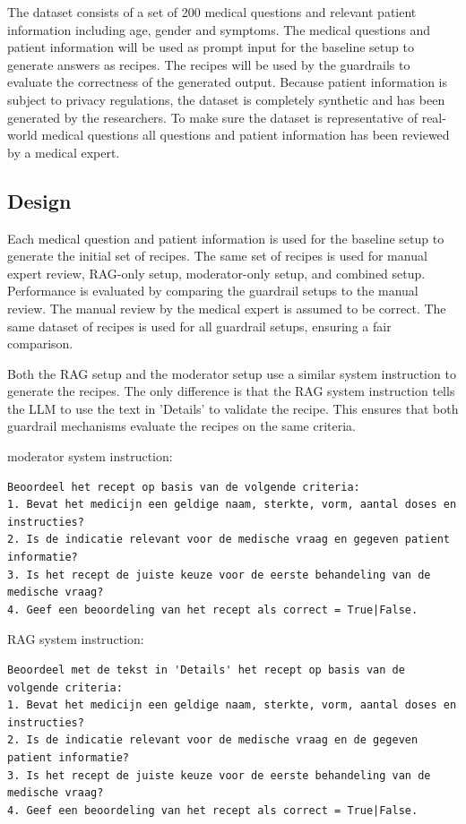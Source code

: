 The dataset consists of a set of 200 medical questions and relevant patient information including age, gender and symptoms.
The medical questions and patient information will be used as prompt input for the baseline setup to generate answers as recipes.
The recipes will be used by the guardrails to evaluate the correctness of the generated output.
Because patient information is subject to privacy regulations, the dataset is completely synthetic and has been generated by the researchers.
To make sure the dataset is representative of real-world medical questions all questions and patient information has been reviewed by a medical expert.

\subsection{Design}

Each medical question and patient information is used for the baseline setup to generate the initial set of recipes.
The same set of recipes is used for manual expert review, RAG-only setup, moderator-only setup, and combined setup.
Performance is evaluated by comparing the guardrail setups to the manual review.
The manual review by the medical expert is assumed to be correct.
The same dataset of recipes is used for all guardrail setups, ensuring a fair comparison.

Both the RAG setup and the moderator setup use a similar system instruction to generate the recipes.
The only difference is that the RAG system instruction tells the LLM to use the text in 'Details' to validate the recipe.
This ensures that both guardrail mechanisms evaluate the recipes on the same criteria.

moderator system instruction:
\begin{verbatim}
Beoordeel het recept op basis van de volgende criteria:
1. Bevat het medicijn een geldige naam, sterkte, vorm, aantal doses en instructies?
2. Is de indicatie relevant voor de medische vraag en gegeven patient informatie?
3. Is het recept de juiste keuze voor de eerste behandeling van de medische vraag?
4. Geef een beoordeling van het recept als correct = True|False.
\end{verbatim}


RAG system instruction:
\begin{verbatim}
Beoordeel met de tekst in 'Details' het recept op basis van de volgende criteria:
1. Bevat het medicijn een geldige naam, sterkte, vorm, aantal doses en instructies?
2. Is de indicatie relevant voor de medische vraag en de gegeven patient informatie?
3. Is het recept de juiste keuze voor de eerste behandeling van de medische vraag?
4. Geef een beoordeling van het recept als correct = True|False.
\end{verbatim}

